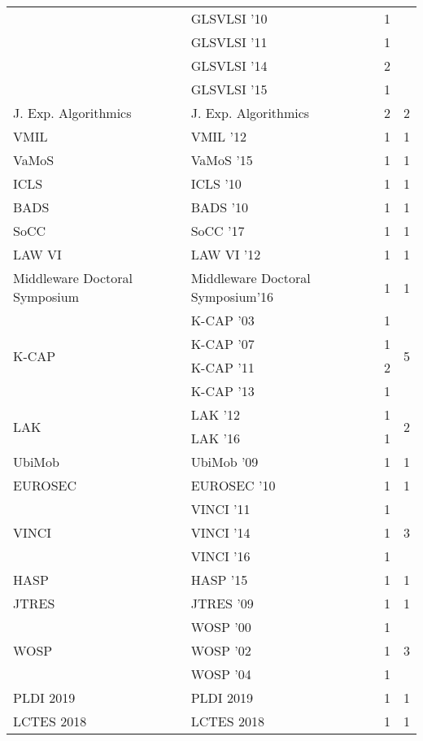 \begin{table*}[t]
\begin{tabular}{llrr}
& GLSVLSI '10 & 1 &\\
& GLSVLSI '11 & 1 &\\
& GLSVLSI '14 & 2 &\\
& GLSVLSI '15 & 1 &\\
\multirow{1}{*}{J. Exp. Algorithmics} & J. Exp. Algorithmics & 2 & \multirow{1}{*}{2}\\
\multirow{1}{*}{VMIL } & VMIL '12 & 1 & \multirow{1}{*}{1}\\
\multirow{1}{*}{VaMoS } & VaMoS '15 & 1 & \multirow{1}{*}{1}\\
\multirow{1}{*}{ICLS } & ICLS '10 & 1 & \multirow{1}{*}{1}\\
\multirow{1}{*}{BADS } & BADS '10 & 1 & \multirow{1}{*}{1}\\
\multirow{1}{*}{SoCC } & SoCC '17 & 1 & \multirow{1}{*}{1}\\
\multirow{1}{*}{LAW VI } & LAW VI '12 & 1 & \multirow{1}{*}{1}\\
\multirow{1}{*}{Middleware Doctoral Symposium} & Middleware Doctoral Symposium'16 & 1 & \multirow{1}{*}{1}\\
\multirow{4}{*}{K-CAP } & K-CAP '03 & 1 & \multirow{4}{*}{5}\\
& K-CAP '07 & 1 &\\
& K-CAP '11 & 2 &\\
& K-CAP '13 & 1 &\\
\multirow{2}{*}{LAK } & LAK '12 & 1 & \multirow{2}{*}{2}\\
& LAK '16 & 1 &\\
\multirow{1}{*}{UbiMob } & UbiMob '09 & 1 & \multirow{1}{*}{1}\\
\multirow{1}{*}{EUROSEC } & EUROSEC '10 & 1 & \multirow{1}{*}{1}\\
\multirow{3}{*}{VINCI } & VINCI '11 & 1 & \multirow{3}{*}{3}\\
& VINCI '14 & 1 &\\
& VINCI '16 & 1 &\\
\multirow{1}{*}{HASP } & HASP '15 & 1 & \multirow{1}{*}{1}\\
\multirow{1}{*}{JTRES } & JTRES '09 & 1 & \multirow{1}{*}{1}\\
\multirow{3}{*}{WOSP } & WOSP '00 & 1 & \multirow{3}{*}{3}\\
& WOSP '02 & 1 &\\
& WOSP '04 & 1 &\\
\multirow{1}{*}{PLDI 2019} & PLDI 2019 & 1 & \multirow{1}{*}{1}\\
\multirow{1}{*}{LCTES 2018} & LCTES 2018 & 1 & \multirow{1}{*}{1}\\

\end{tabular}
\end{table*}
